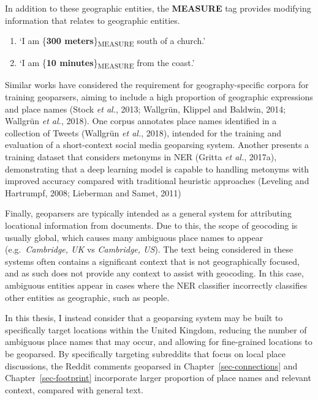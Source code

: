 \documentclass[
  letterpaper,
  11pt,
  english,
  onehalfspacing,
  headsepline]{MastersDoctoralThesis}
\begin{document}
In addition to these geographic entities, the \textbf{MEASURE} tag
provides modifying information that relates to geographic entities.

\begin{enumerate}
\def\labelenumi{\alph{enumi}.}
\item
  `I am \{\textbf{300 meters}\}\textsubscript{MEASURE} south of a
  church.'
\item
  `I am \{\textbf{10 minutes}\}\textsubscript{MEASURE} from the coast.'
\end{enumerate}

Similar works have considered the requirement for geography-specific
corpora for training geoparsers, aiming to include a high proportion of
geographic expressions and place names (Stock \emph{et al.}, 2013;
Wallgrün, Klippel and Baldwin, 2014; Wallgrün \emph{et al.}, 2018). One
corpus annotates place names identified in a collection of Tweets
(Wallgrün \emph{et al.}, 2018), intended for the training and evaluation
of a short-context social media geoparsing system. Another presents a
training dataset that considers metonyms in NER (Gritta \emph{et al.},
2017a), demonstrating that a deep learning model is capable to handling
metonyms with improved accuracy compared with traditional heuristic
approaches (Leveling and Hartrumpf, 2008; Lieberman and Samet, 2011)

Finally, geoparsers are typically intended as a general system for
attributing locational information from documents. Due to this, the
scope of geocoding is usually global, which causes many ambiguous place
names to appear (e.g.~\emph{Cambridge, UK} vs \emph{Cambridge, US}). The
text being considered in these systems often contains a significant
context that is not geographically focused, and as such does not provide
any context to assist with geocoding. In this case, ambiguous entities
appear in cases where the NER classifier incorrectly classifies other
entities as geographic, such as people.

In this thesis, I instead consider that a geoparsing system may be built
to specifically target locations within the United Kingdom, reducing the
number of ambiguous place names that may occur, and allowing for
fine-grained locations to be geoparsed. By specifically targeting
subreddits that focus on local place discussions, the Reddit comments
geoparsed in Chapter~\ref{sec-connections} and
Chapter~\ref{sec-footprint} incorporate larger proportion of place names
and relevant context, compared with general text.
\end{document}
